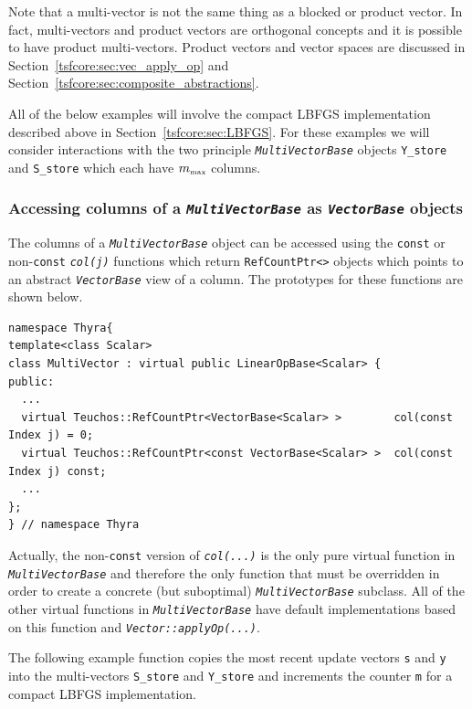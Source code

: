 \documentclass[pdf,ps2pdf,11pt]{SANDreport}
\begin{document}
Note that a multi-vector is not the same thing as a blocked or product vector.
In fact, multi-vectors and product vectors are orthogonal concepts and it is
possible to have product multi-vectors.  Product vectors and vector spaces are
discussed in Section~\ref{tsfcore:sec:vec_apply_op} and
Section~\ref{tsfcore:sec:composite_abstractions}.

All of the below examples will involve the compact LBFGS implementation
described above in Section~\ref{tsfcore:sec:LBFGS}.  For these examples we
will consider interactions with the two principle
{}\texttt{\textit{Multi\-Vector\-Base}} objects {}\texttt{Y\_store} and
{}\texttt{S\_store} which each have $m_{\tiny\mbox{max}}$ columns.

%
\subsubsection{Accessing columns of a {}\texttt{\textit{Multi\-Vector\-Base}}
as {}\texttt{\textit{Vector\-Base}} objects}
%

The columns of a {}\texttt{\textit{Multi\-Vector\-Base}} object can be
accessed using the {}\texttt{const} or non-\texttt{const}
{}\texttt{\textit{col(j)}} functions which return
{}\texttt{RefCountPtr<>} objects which points to an abstract
{}\texttt{\textit{Vector\-Base}} view of a column.  The prototypes for these
functions are shown below.

{\scriptsize\begin{verbatim}
namespace Thyra{
template<class Scalar>
class MultiVector : virtual public LinearOpBase<Scalar> {
public:
  ...
  virtual Teuchos::RefCountPtr<VectorBase<Scalar> >        col(const Index j) = 0;
  virtual Teuchos::RefCountPtr<const VectorBase<Scalar> >  col(const Index j) const;
  ...
};
} // namespace Thyra
\end{verbatim}}

{}\noindent{}Actually, the non-\texttt{const} version of
{}\texttt{\textit{col(...)}}  is the only pure virtual function in
{}\texttt{\textit{Multi\-Vector\-Base}} and therefore the only function that
must be overridden in order to create a concrete (but suboptimal)
{}\texttt{\textit{Multi\-Vector\-Base}} subclass.  All of the other virtual
functions in {}\texttt{\textit{Multi\-Vector\-Base}} have default
implementations based on this function and
{}\texttt{\textit{Vector\-::applyOp(\-...)}}.

The following example function copies the most recent update vectors
{}\texttt{s} and {}\texttt{y} into the multi-vectors
{}\texttt{S\_store} and {}\texttt{Y\_store} and increments the counter
{}\texttt{m} for a compact LBFGS implementation.
\end{document}

